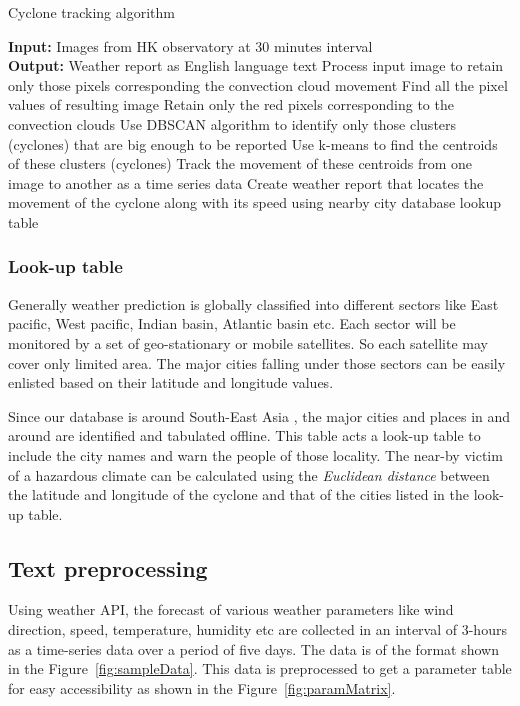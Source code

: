 \documentclass{article}
\begin{document}
\begin{algorithm}[!th]
\caption{Cyclone tracking algorithm}
\label{algo:img}
\begin{algorithmic}[1]

\STATE  \textbf{Input:} Images from HK observatory at 30 minutes interval\\
\textbf{Output:} Weather report as English language text 
\STATE Process input image to retain only those pixels corresponding the convection cloud movement
\STATE Find all the pixel values of resulting image
\STATE Retain only the red pixels corresponding to the convection clouds
\STATE Use DBSCAN algorithm to identify only those clusters (cyclones) that are big enough to be reported
\STATE Use k-means to find the centroids of these clusters (cyclones)
\STATE Track the movement of these centroids from one image to another as a time series data
\STATE Create weather report that locates the movement of the cyclone along with its speed using nearby city database lookup table
\end{algorithmic}
\end{algorithm}

\subsubsection*{Look-up table}
\label{sssec:lookupTable}

Generally weather prediction is globally classified into different sectors like East 
pacific, West pacific, Indian basin, Atlantic basin etc. Each sector will be monitored 
by a set of geo-stationary or mobile satellites. So each satellite may cover only 
limited area. The major cities falling under those sectors can be easily enlisted based 
on their latitude and longitude values. 

Since our database is around South-East Asia , the major 
cities and places in and around are identified and tabulated offline. This table acts a 
look-up table to include the city names and warn the people of those locality. The 
near-by victim of a hazardous climate can be calculated using the {\textit{Euclidean 
distance}} between the latitude and longitude of the cyclone and that of the cities 
listed in the look-up table.

\subsection{Text preprocessing}
\label{ssec:txtPreprocessing}
Using weather API, the forecast of various weather parameters like wind direction, speed, temperature, humidity etc are collected in an interval of 3-hours as a time-series data over a period of five days. The data is of the format shown in the Figure~\ref{fig:sampleData}. This data is preprocessed to get a parameter table for easy accessibility as shown in the Figure~\ref{fig:paramMatrix}.
\end{document}
